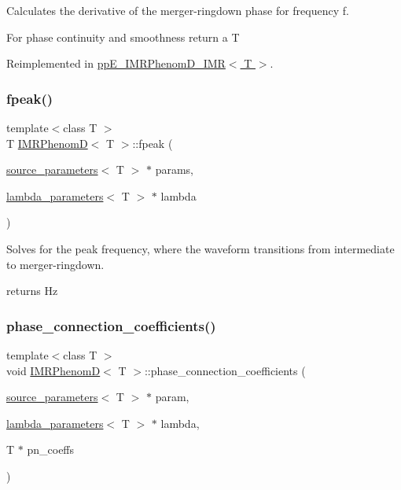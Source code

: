 Calculates the derivative of the merger-\/ringdown phase for frequency f. 

For phase continuity and smoothness return a T 

Reimplemented in \hyperlink{classppE__IMRPhenomD__IMR_a3fa643eca535e7bef26f70bd5ed4cbde}{pp\+E\+\_\+\+I\+M\+R\+Phenom\+D\+\_\+\+I\+M\+R$<$ T $>$}.

\mbox{\label{classIMRPhenomD_a31c4222e9a39b6eadd42c4f6707d8245}} 
\subsubsection{\texorpdfstring{fpeak()}{fpeak()}}
{\footnotesize\ttfamily template$<$class T $>$ \\
T \hyperlink{classIMRPhenomD}{I\+M\+R\+PhenomD}$<$ T $>$\+::fpeak (\begin{DoxyParamCaption}\item[{\hyperlink{structsource__parameters}{source\+\_\+parameters}$<$ T $>$ $\ast$}]{params,  }\item[{\hyperlink{structlambda__parameters}{lambda\+\_\+parameters}$<$ T $>$ $\ast$}]{lambda }\end{DoxyParamCaption})\hspace{0.3cm}{\ttfamily [virtual]}}



Solves for the peak frequency, where the waveform transitions from intermediate to merger-\/ringdown. 

returns Hz \mbox{\label{classIMRPhenomD_a6847c2c48302ff863b9a93354e71afcc}} 
\subsubsection{\texorpdfstring{phase\+\_\+connection\+\_\+coefficients()}{phase\_connection\_coefficients()}}
{\footnotesize\ttfamily template$<$class T $>$ \\
void \hyperlink{classIMRPhenomD}{I\+M\+R\+PhenomD}$<$ T $>$\+::phase\+\_\+connection\+\_\+coefficients (\begin{DoxyParamCaption}\item[{\hyperlink{structsource__parameters}{source\+\_\+parameters}$<$ T $>$ $\ast$}]{param,  }\item[{\hyperlink{structlambda__parameters}{lambda\+\_\+parameters}$<$ T $>$ $\ast$}]{lambda,  }\item[{T $\ast$}]{pn\+\_\+coeffs }\end{DoxyParamCaption})\hspace{0.3cm}{\ttfamily [virtual]}}



